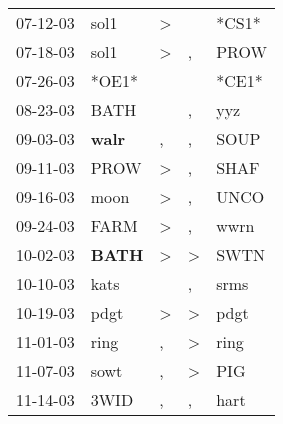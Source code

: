 \begin{supertabular}{p{0.07\textwidth}p{0.06\textwidth}p{0.02\textwidth}p{0.02\textwidth}p{0.06\textwidth}}
          07-12-03\textsuperscript{} &           sol1\textsuperscript{} &     \textgreater &                  &                            *CS1* \\
          07-18-03\textsuperscript{} &           sol1\textsuperscript{} &     \textgreater &                , &           PROW\textsuperscript{} \\
          07-26-03\textsuperscript{} &                            *OE1* &                  &                  &                            *CE1* \\
          08-23-03\textsuperscript{} &           BATH\textsuperscript{} &                  &                , &            yyz\textsuperscript{} \\
          09-03-03\textsuperscript{} &  \textbf{walr\textsuperscript{}} &                , &                , &           SOUP\textsuperscript{} \\
          09-11-03\textsuperscript{} &           PROW\textsuperscript{} &     \textgreater &                , &           SHAF\textsuperscript{} \\
          09-16-03\textsuperscript{} &           moon\textsuperscript{} &     \textgreater &                , &           UNCO\textsuperscript{} \\
          09-24-03\textsuperscript{} &           FARM\textsuperscript{} &     \textgreater &                , &           wwrn\textsuperscript{} \\
          10-02-03\textsuperscript{} &  \textbf{BATH\textsuperscript{}} &     \textgreater &     \textgreater &           SWTN\textsuperscript{} \\
          10-10-03\textsuperscript{} &           kats\textsuperscript{} &                  &                , &           srms\textsuperscript{} \\
          10-19-03\textsuperscript{} &           pdgt\textsuperscript{} &     \textgreater &     \textgreater &           pdgt\textsuperscript{} \\
          11-01-03\textsuperscript{} &           ring\textsuperscript{} &                , &     \textgreater &           ring\textsuperscript{} \\
          11-07-03\textsuperscript{} &           sowt\textsuperscript{} &                , &     \textgreater &            PIG\textsuperscript{} \\
          11-14-03\textsuperscript{} &           3WID\textsuperscript{} &                , &                , &           hart\textsuperscript{} \\

\end{supertabular}
